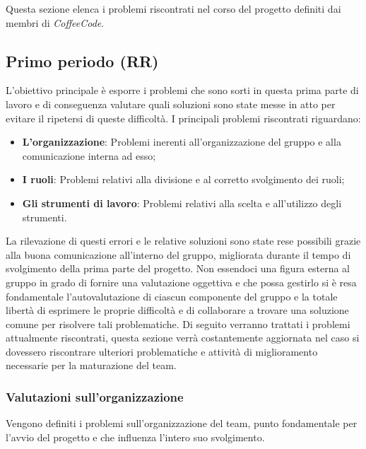 \documentclass[../piano-di-qualifica.tex]{subfiles}
\begin{document}
Questa sezione elenca i problemi riscontrati nel corso del progetto definiti dai membri di \emph{CoffeeCode}.

\subsection{Primo periodo (RR)}
\label{sub:primo_periodo_rr}
L'obiettivo principale è esporre i problemi che sono sorti in questa prima parte di lavoro e di conseguenza valutare quali soluzioni sono state messe in atto per evitare il ripetersi di queste difficoltà.
I principali problemi riscontrati riguardano:
\begin{itemize}
    \item \textbf{L'organizzazione}: Problemi inerenti all'organizzazione del gruppo e alla comunicazione interna ad esso;
    \item \textbf{I ruoli}: Problemi relativi alla divisione e al corretto svolgimento dei ruoli;
    \item \textbf{Gli strumenti di lavoro}: Problemi relativi alla scelta e all'utilizzo degli strumenti.
\end{itemize}
La rilevazione di questi errori e le relative soluzioni sono state rese possibili grazie alla buona comunicazione all'interno del gruppo, migliorata durante il tempo di svolgimento della prima parte del progetto.
Non essendoci una figura esterna al gruppo in grado di fornire una valutazione oggettiva e che possa gestirlo si è resa fondamentale l'autovalutazione di ciascun componente del gruppo e la totale libertà di esprimere le proprie difficoltà e di collaborare a trovare una soluzione comune per risolvere tali problematiche.
Di seguito verranno trattati i problemi attualmente riscontrati, questa sezione verrà costantemente aggiornata nel caso si dovessero riscontrare ulteriori problematiche e attività di miglioramento necessarie per la maturazione del team.

\subsubsection{Valutazioni sull’organizzazione}
\label{sssec:valutazioni_organizzazione}
Vengono definiti i problemi sull'organizzazione del team, punto fondamentale per l'avvio del progetto e che influenza l'intero suo svolgimento.
\end{document}
